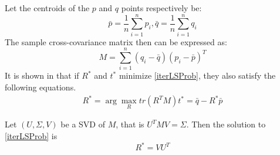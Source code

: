 Let the centroids of the $p$ and $q$ points respectively be:
\begin{equation}
	\bar{p} = \frac{1}{n} \sum_{i=1}^{n} p_i,
	\bar{q} = \frac{1}{n} \sum_{i=1}^{n} q_i
\end{equation}
The sample cross-covariance matrix then can be expressed as:
\begin{equation}
	M = \sum_{i=1}^{n} (q_i - \bar{q})(p_i - \bar{p})^T
\end{equation}
It is shown in \cite{iterative} that if $R^*$ and $t^*$ minimize \eqref{iterLSProb}, they also satisfy the following equations.
\begin{align}
	R^* = \arg \max_R tr(R^TM)
	t^* = \bar{q} - R^*\bar{p}
\end{align}

Let $(U,\Sigma, V)$ be a SVD of $M$, that is $U^TMV=\Sigma$. Then the solution to \eqref{iterLSProb} is\cite{iterative}
\begin{equation}
	R^* = VU^T
	\label{eq:iterOrientSolution}
\end{equation}

